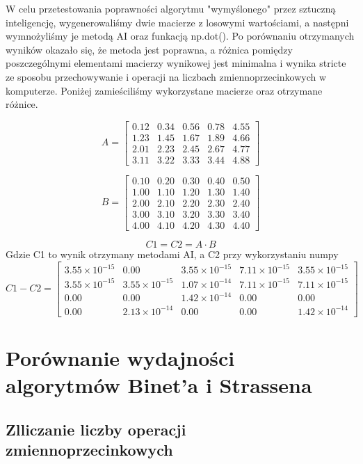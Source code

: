 \documentclass{article}
\begin{document}
W celu przetestowania poprawności algorytmu "wymyślonego" przez sztuczną inteligencję, wygenerowaliśmy dwie macierze z losowymi wartościami, a następni wymnożyliśmy je metodą AI oraz funkacją np.dot(). Po porównaniu otrzymanych wyników okazało się, że metoda jest poprawna, a różnica pomiędzy poszczególnymi elementami macierzy wynikowej jest minimalna i wynika stricte ze sposobu przechowywanie i operacji na liczbach zmiennoprzecinkowych w komputerze. Poniżej zamieściliśmy wykorzystane macierze oraz otrzymane różnice.

\[
A = \begin{bmatrix}
0.12 & 0.34 & 0.56 & 0.78 & 4.55 \\
1.23 & 1.45 & 1.67 & 1.89 & 4.66 \\
2.01 & 2.23 & 2.45 & 2.67 & 4.77 \\
3.11 & 3.22 & 3.33 & 3.44 & 4.88
\end{bmatrix}
\]

\[
B = \begin{bmatrix}
0.10 & 0.20 & 0.30 & 0.40 & 0.50 \\
1.00 & 1.10 & 1.20 & 1.30 & 1.40 \\
2.00 & 2.10 & 2.20 & 2.30 & 2.40 \\
3.00 & 3.10 & 3.20 & 3.30 & 3.40 \\
4.00 & 4.10 & 4.20 & 4.30 & 4.40
\end{bmatrix}
\]

\[
C1 = C2 = A \cdot B
\]
Gdzie C1 to wynik otrzymany metodami AI, a C2 przy wykorzystaniu numpy
\[
C1 - C2 =
\begin{bmatrix}
3.55 \times 10^{-15} & 0.00 & 3.55 \times 10^{-15} & 7.11 \times 10^{-15} & 3.55 \times 10^{-15} \\
3.55 \times 10^{-15} & 3.55 \times 10^{-15} & 1.07 \times 10^{-14} & 7.11 \times 10^{-15} & 7.11 \times 10^{-15} \\
0.00 & 0.00 & 1.42 \times 10^{-14} & 0.00 & 0.00 \\
0.00 & 2.13 \times 10^{-14} & 0.00 & 0.00 & 1.42 \times 10^{-14}
\end{bmatrix}
\]


\section{Porównanie wydajności algorytmów Binet'a i Strassena}

\subsection{Zlliczanie liczby operacji zmiennoprzecinkowych}
\end{document}
